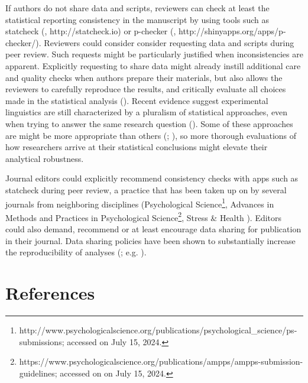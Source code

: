 \documentclass[
  doc,
  longtable,
  nolmodern,
  notxfonts,
  notimes,
  colorlinks=true,linkcolor=blue,citecolor=blue,urlcolor=blue]{apa7}
\begin{document}
If authors do not share data and scripts, reviewers can check at least
the statistical reporting consistency in the manuscript by using tools
such as statcheck (, http://statcheck.io) or p-checker
(,
http://shinyapps.org/apps/p-checker/). Reviewers could consider consider
requesting data and scripts during peer review. Such requests might be
particularly justified when inconsistencies are apparent. Explicitly
requesting to share data might already instill additional care and
quality checks when authors prepare their materials, but also allows the
reviewers to carefully reproduce the results, and critically evaluate
all choices made in the statistical analysis
(). Recent
evidence suggest experimental linguistics are still characterized by a
pluralism of statistical approaches, even when trying to answer the same
research question (). Some of these approaches are might be more appropriate
than others (; ), so
more thorough evaluations of how researchers arrive at their statistical
conclusions might elevate their analytical robustness.

Journal editors could explicitly recommend consistency checks with apps
such as statcheck during peer review, a practice that has been taken up
on by several journals from neighboring disciplines (Psychological
Science\footnote{http://www.psychologicalscience.org/publications/psychological\_science/ps-submissions;
  accessed on July 15, 2024.}, Advances in Methods and Practices in
Psychological Science\footnote{https://www.psychologicalscience.org/publications/ampps/ampps-submission-guidelines;
  accessed on on July 15, 2024.}, Stress \& Health
). Editors could also
demand, recommend or at least encourage data sharing for publication in
their journal. Data sharing policies have been shown to substantially
increase the reproducibility of analyses
(; e.g.
).

\section{References}\label{references}
\end{document}
